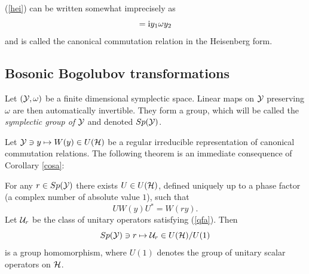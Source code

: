 \documentclass{svmult}
\newcommand{\beq}{\begin{equation}}
\newcommand{\eeq}{\end{equation}}
\def\bet{\begin{theorem}}
\def\eet{\end{theorem}}
\def\proof{
\noindent{\bf Proof.}\ \ }
\def\cY{{\cal Y}}
\def\cU{{\cal U}}
\def\i{{\rm i}}
\def\Dom{{\rm Dom}}
\def\qed{$\Box$\medskip}
\def\e{{\rm e}}
\def\cH{{\cal H}}
\def\e{{\rm e}}
\def\cH{{\cal H}}
\begin{document}
(\ref{hei}) can be written somewhat imprecisely as
\beq[\phi^\pi(y_1),\phi^\pi(y_2)]=\i y_1\omega y_2\label{impr}\eeq
and is called the
 canonical commutation relation in the Heisenberg form.






\subsection{Bosonic 
Bogolubov transformations}

Let $(\cY,\omega)$ be a finite dimensional symplectic space.
Linear maps on $\cY$ preserving $\omega$ are then automatically invertible.
 They  form a group, which will be called the {\em symplectic group of
$\cY$} and denoted $Sp(\cY)$.

Let
$\cY\ni y\mapsto W(y)\in U(\cH)$ be a regular
irreducible representation of canonical commutation relations.
The following theorem is an immediate  consequence of Corollary \ref{cosa}:

\bet For any $r\in Sp(\cY)$ there exists $U\in U(\cH)$, defined uniquely up
to a phase factor (a complex number of absolute value $1$), such that
\beq U W(y)U^*=W(ry).\label{qfa}\eeq
Let $\cU_r$ be  the class of unitary operators satisfying (\ref{qfa}). Then
\[Sp(\cY)\ni r\mapsto \cU_r\in  U(\cH)/U(1)\]
is a group homomorphism, where $U(1)$ denotes the group of unitary scalar
operators on $\cH$.
\label{bogo}\eet
\end{document}
